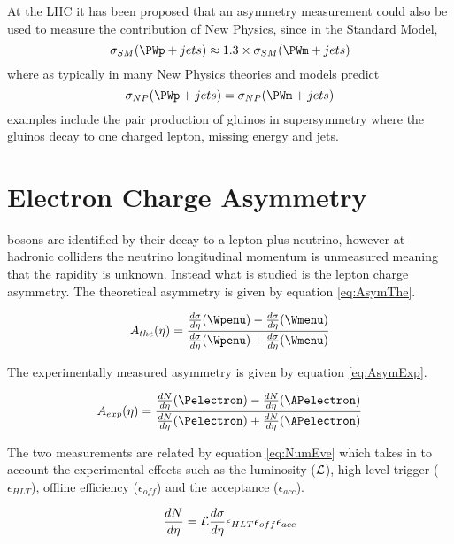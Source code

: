 At the LHC it has been proposed \cite{kom} that an asymmetry measurement could
also be used to measure the contribution of New Physics, since in the Standard
Model, \begin{equation}
\sigma_{SM}(\PWp + jets) \approx 1.3 \times \sigma_{SM}(\PWm + jets)
\end{equation}
where as typically in many New Physics theories and models predict
\begin{equation}
\sigma_{NP}(\PWp + jets) = \sigma_{NP}(\PWm + jets)
\end{equation}
examples include the pair production of gluinos in supersymmetry where the
gluinos decay to one charged lepton, missing energy and jets.\cite{kom}

\section{Electron Charge Asymmetry}

\PW bosons are identified by their decay to a lepton plus neutrino, however at
hadronic colliders the neutrino longitudinal momentum is unmeasured meaning
that the \PW rapidity is unknown. Instead what is studied is the lepton charge
asymmetry.\cite{phenom} The theoretical asymmetry is given by equation
\ref{eq:AsymThe}.

\begin{equation}
A_{the}(\eta)=\frac{  \frac{d\sigma}{d\eta}(\Wpenu) -
\frac{d\sigma}{d\eta}(\Wmenu) }{ \frac{d\sigma}{d\eta}(\Wpenu) +
\frac{d\sigma}{d\eta}(\Wmenu) }
\label{eq:AsymThe}
\end{equation} 

The experimentally measured asymmetry is given by equation
\ref{eq:AsymExp}.\cite{kom}
 
\begin{equation}
A_{exp}(\eta)=\frac{  \frac{dN}{d\eta}(\Pelectron) -
\frac{dN}{d\eta}(\APelectron) }{ \frac{dN}{d\eta}(\Pelectron) +
\frac{dN}{d\eta}(\APelectron) }
\label{eq:AsymExp}
\end{equation} 

The two measurements are related by equation \ref{eq:NumEve} which takes in to
account the experimental effects such as the luminosity (${\cal L}$), high
level trigger ($\epsilon_{HLT}$), offline efficiency ($ \epsilon_{off}$) and
the acceptance ($\epsilon_{acc}$).

\begin{equation}
\frac{dN}{d\eta} = {\cal L } \frac{d\sigma}{d\eta}  \epsilon_{HLT}
\epsilon_{off} \epsilon_{acc}
\label{eq:NumEve}
\end{equation} 

